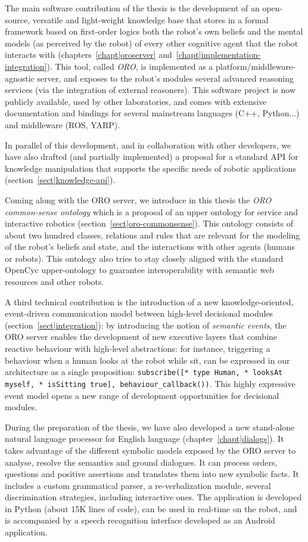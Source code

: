 The main software contribution of the thesis is the development of an
open-source, versatile and light-weight knowledge base that stores in a formal
framework based on first-order logics both the robot's own beliefs and the
mental models (as perceived by the robot) of every other cognitive agent that
the robot interacts with (chapters~\ref{chapt|oroserver}
and~\ref{chapt|implementation-integration}).  This tool, called \emph{ORO}, is
implemented as a platform/middleware-agnostic server, and exposes to the
robot's modules several advanced reasoning services (via the integration of
external reasoners). This software project is now publicly available, used by
other laboratories, and comes with extensive documentation and bindings for
several mainstream languages (C++, Python...) and middleware (ROS, YARP).

In parallel of this development, and in collaboration with other developers, we
have also drafted (and partially implemented) a proposal for a standard API for
knowledge manipulation that supports the specific needs of robotic applications
(section~\ref{sect|knowledge-api}).

Coming along with the ORO server, we introduce in this thesis the \emph{ORO
common-sense ontology} which is a proposal of an upper ontology for service and
interactive robotics (section~\ref{sect|oro-commonsense}). This ontology
consists of about two hundred classes, relations and rules that are relevant
for the modeling of the robot's beliefs and state, and the interactions with
other agents (humans or robots). This ontology also tries to stay closely
aligned with the standard {\sc OpenCyc} upper-ontology to guarantee
interoperability with semantic web resources and other robots.

A third technical contribution is the introduction of a new knowledge-oriented,
event-driven communication model between high-level decisional modules
(section~\ref{sect|integration}): by introducing the notion of \emph{semantic
events}, the ORO server enables the development of new executive layers that
combine reactive behaviour with high-level abstractions: for instance,
triggering a behaviour when a human looks at the robot while sit, can be
expressed in our architecture as a single proposition: {\tt subscribe([* type
Human, * looksAt myself, * isSitting true], behaviour\_callback())}. This
highly expressive event model opens a new range of development opportunities for
decisional modules.

During the preparation of the thesis, we have also developed a new stand-alone
natural language processor for English language (chapter~\ref{chapt|dialogs}).
It takes advantage of the different symbolic models exposed by the ORO server
to analyse, resolve the semantics and ground dialogues. It can process orders,
questions and positive assertions and translates them into new symbolic facts.
It includes a custom grammatical parser, a re-verbalization module, several
discrimination strategies, including interactive ones. The application is
developed in Python (about 15K lines of code), can be used in real-time on the
robot, and is accompanied by a speech recognition interface developed as an
Android application.

